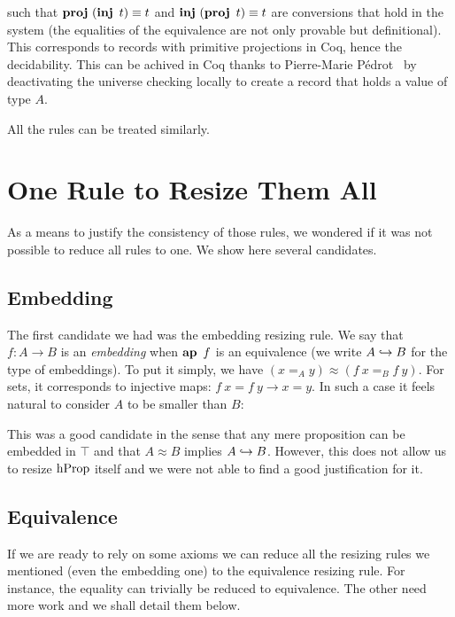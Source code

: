 \documentclass[11pt]{article}
\theoremstyle{plain}
\theoremstyle{remark}
\begin{document}
\begin{mathc}
  \qquad
\end{mathc}
%
\noindent
such that $\operatorname{\mathbf{proj}}\ (\operatorname{\mathbf{inj}}\ t) \equiv t$ and $\operatorname{\mathbf{inj}}\ (\operatorname{\mathbf{proj}}\ t) \equiv t$ are
conversions that hold in the system (the equalities of the equivalence are not
only provable but definitional).
This corresponds to records with primitive projections in Coq, hence the
decidability.
%
This can be achived in Coq thanks to Pierre-Marie Pédrot~\cite{pperdot:pr} by
deactivating the universe checking locally to create a record that holds a
value of type $A$.

All the rules can be treated similarly.


\section{One Rule to Resize Them All}

As a means to justify the consistency of those rules, we wondered if it was not
possible to reduce all rules to one. We show here several candidates.

\subsection{Embedding}
The first candidate we had was the embedding resizing rule.
We say that $f : A \to B$  is an \emph{embedding} when $\operatorname{\mathbf{ap}}\ f$ is an
equivalence (we write $A \hookrightarrow B$ for the type of embeddings).
To put it simply, we have $(x =_A y) \approx (f\ x =_B f\ y)$.
For sets, it corresponds to injective maps:
$f\ x = f\ y \to x = y$.
In such a case it feels natural to consider $A$ to be smaller than $B$:

\begin{mathc}
\end{mathc}

\noindent
This was a good candidate in the sense that any mere proposition can be embedded
in $\top$ and that $A \approx B$ implies $A \hookrightarrow B$.
However, this does not allow us to resize $\operatorname{hProp}$ itself and we were not able
to find a good justification for it.

\subsection{Equivalence}
If we are ready to rely on some axioms we can reduce all the resizing rules we
mentioned (even the embedding one) to the equivalence resizing rule.
For instance, the equality can trivially be reduced to equivalence.
The other need more work and we shall detail them below.
\end{document}
